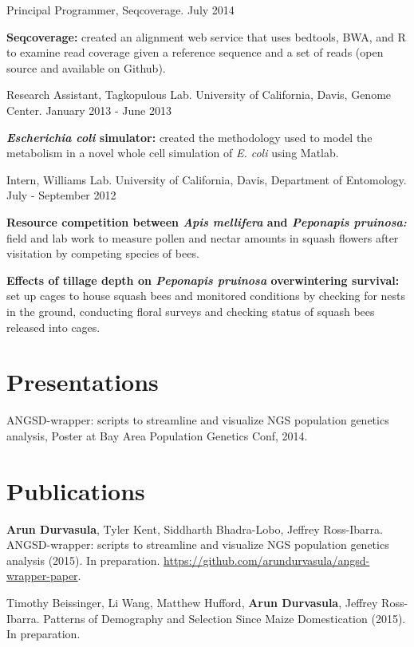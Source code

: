 \documentclass[letterpaper]{article}
\renewenvironment{itemize}{
  \begin{list}{}{
    \setlength{\leftmargin}{1.5em}
  }
}{
  \end{list}
}
\begin{document}
\begin{itemize}
\begin{itemize}
	\end{itemize}
\item Principal Programmer, Seqcoverage. \hfill July 2014
	\begin{itemize}
	\item \textbf{Seqcoverage:} created an alignment web service that uses bedtools, BWA, and R to examine read coverage given a reference sequence and a set of reads (open source and available on Github).
	\end{itemize}
\item Research Assistant, Tagkopulous Lab. University of California, Davis, Genome Center. \hfill January 2013 - June 2013
	\begin{itemize}
	\item \textbf{\textit{Escherichia coli} simulator:} created the methodology used to model the metabolism in a novel whole cell simulation of \textit{E. coli} using Matlab.
	\end{itemize}
\item Intern, Williams Lab. University of California, Davis, Department of Entomology. \hfill July - September 2012
	\begin{itemize}
	\item \textbf{Resource competition between \textit{Apis mellifera} and \textit{Peponapis pruinosa:}} field and lab work to measure pollen and nectar amounts in squash flowers after visitation by competing species of bees.
	\item \textbf{Effects of tillage depth on \textit{Peponapis pruinosa} overwintering survival:} set up cages to house squash bees and monitored conditions by checking for nests in the ground, conducting floral surveys and checking status of squash bees released into cages.
	\end{itemize}
\end{itemize}

\section*{Presentations}
\begin{itemize}
\item ANGSD-wrapper: scripts to streamline and visualize NGS population genetics analysis, Poster at Bay Area Population Genetics Conf, 2014.
\end{itemize}

\section*{Publications}
\begin{itemize}
\item {\bf Arun Durvasula}, Tyler Kent, Siddharth Bhadra-Lobo, Jeffrey Ross-Ibarra. ANGSD-wrapper: scripts to streamline and visualize NGS population genetics analysis (2015). In preparation. \url{https://github.com/arundurvasula/angsd-wrapper-paper}.
\item Timothy Beissinger, Li Wang, Matthew Hufford, {\bf Arun Durvasula}, Jeffrey Ross-Ibarra. Patterns of Demography and Selection Since Maize Domestication (2015). In preparation.
\end{itemize}
\end{document}

